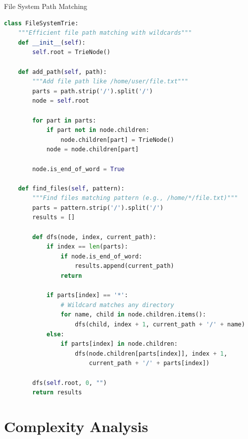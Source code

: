 \documentclass[aspectratio=169]{beamer}
\begin{document}
\begin{frame}[fragile]{File System Path Matching}
  \begin{lstlisting}[language=Python, basicstyle=\ttfamily\footnotesize]
class FileSystemTrie:
    """Efficient file path matching with wildcards"""
    def __init__(self):
        self.root = TrieNode()

    def add_path(self, path):
        """Add file path like /home/user/file.txt"""
        parts = path.strip('/').split('/')
        node = self.root

        for part in parts:
            if part not in node.children:
                node.children[part] = TrieNode()
            node = node.children[part]

        node.is_end_of_word = True

    def find_files(self, pattern):
        """Find files matching pattern (e.g., /home/*/file.txt)"""
        parts = pattern.strip('/').split('/')
        results = []

        def dfs(node, index, current_path):
            if index == len(parts):
                if node.is_end_of_word:
                    results.append(current_path)
                return

            if parts[index] == '*':
                # Wildcard matches any directory
                for name, child in node.children.items():
                    dfs(child, index + 1, current_path + '/' + name)
            else:
                if parts[index] in node.children:
                    dfs(node.children[parts[index]], index + 1,
                        current_path + '/' + parts[index])

        dfs(self.root, 0, "")
        return results
  \end{lstlisting}
\end{frame}

\section{Complexity Analysis}
\end{document}
